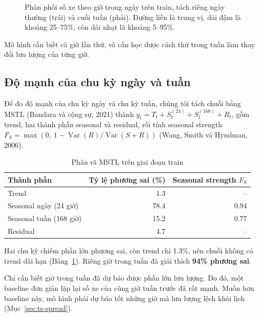 \begin{figure}[H]
\centering
{}
\caption{Phân phối số xe theo giờ trong ngày trên train, tách riêng ngày thường (trái) và cuối tuần (phải). Đường liền là trung vị, dải
đậm là khoảng 25--75\%, còn dải nhạt là khoảng 5--95\%.}
\label{fig:ts-target-hour}
\end{figure}

\begin{tsinsight}
Mô hình cần biết cả giờ lẫn thứ, và cần học được cách thứ trong tuần làm thay đổi lưu lượng của từng giờ.
\end{tsinsight}

\subsection{Độ mạnh của chu kỳ ngày và tuần}
\label{sec:ts-mstl}
Để đo độ mạnh của chu kỳ ngày và chu kỳ tuần, chúng tôi tách chuỗi bằng MSTL (Bandara và cộng sự, 2021) thành
$y_t = T_t + S^{(24)}_t + S^{(168)}_t + R_t$, gồm trend, hai thành phần seasonal và residual, rồi tính seasonal strength
$F_S = \max\left(0,\ 1 - \operatorname{Var}(R)/\operatorname{Var}(S + R)\right)$ (Wang, Smith và Hyndman, 2006).

\begin{table}[H]
\centering
\caption{Phân rã MSTL trên giai đoạn train}
\label{tab:ts-mstl}
\begin{tabular}{lrr}
\toprule
Thành phần & Tỷ lệ phương sai (\%) & Seasonal strength $F_S$\\
\midrule
Trend & 1.3 & --\\
Seasonal ngày (24 giờ) & 78.4 & 0.94\\
Seasonal tuần (168 giờ) & 15.2 & 0.77\\
Residual & 4.7 & --\\
\bottomrule
\end{tabular}
\end{table}

Hai chu kỳ chiếm phần lớn phương sai, còn trend chỉ 1.3\%, nên chuỗi không có trend dài hạn (Bảng~\ref{tab:ts-mstl}). Riêng giờ trong tuần đã giải thích \textbf{94\%
phương sai}.

\begin{tsinsight}
Chỉ cần biết giờ trong tuần đã dự báo được phần lớn lưu lượng. Do đó, một baseline đơn giản lặp lại số xe của cùng giờ tuần trước đã
rất mạnh. Muốn hơn baseline này, mô hình phải dự báo tốt những giờ mà lưu lượng lệch khỏi lịch
(Mục~\ref{sec:ts-spread}).
\end{tsinsight}

